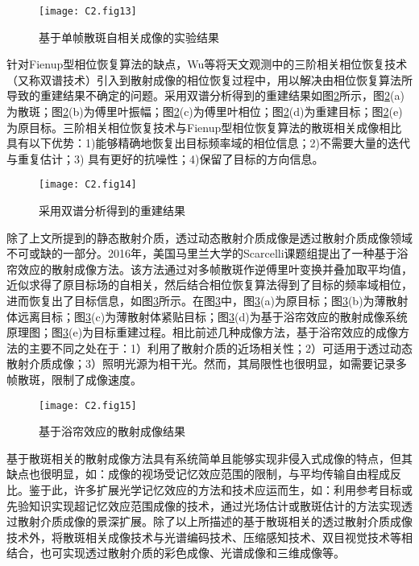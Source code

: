 \begin{figure}[htp]
	\centering
	\texttt{[image: C2.fig13]}
	\caption{基于单帧散斑自相关成像的实验结果}
	\label{fig2:13}
\end{figure}

针对Fienup型相位恢复算法的缺点，Wu等将天文观测中的三阶相关相位恢复技术（又称双谱技术）引入到散射成像的相位恢复过程中，用以解决由相位恢复算法所导致的重建结果不确定的问题。采用双谱分析得到的重建结果如图\ref{fig2:14}所示，图\ref{fig2:14}(a)为散斑；图\ref{fig2:14}(b)为傅里叶振幅；图\ref{fig2:14}(c)为傅里叶相位；图\ref{fig2:14}(d)为重建目标；图\ref{fig2:14}(e)为原目标。三阶相关相位恢复技术与Fienup型相位恢复算法的散斑相关成像相比具有以下优势：1)能够精确地恢复出目标频率域的相位信息；2)不需要大量的迭代与重复估计；3) 具有更好的抗噪性；4)保留了目标的方向信息。

\begin{figure}[htp]
	\centering
	\texttt{[image: C2.fig14]}
	\caption{采用双谱分析得到的重建结果}
	\label{fig2:14}
\end{figure}

除了上文所提到的静态散射介质，透过动态散射介质成像是透过散射介质成像领域不可或缺的一部分。2016年，美国马里兰大学的Scarcelli课题组提出了一种基于浴帘效应的散射成像方法。该方法通过对多帧散斑作逆傅里叶变换并叠加取平均值，近似求得了原目标场的自相关，然后结合相位恢复算法得到了目标的频率域相位，进而恢复出了目标信息，如图\ref{fig2:15}所示。在图\ref{fig2:15}中，图\ref{fig2:15}(a)为原目标；图\ref{fig2:15}(b)为薄散射体远离目标；图\ref{fig2:15}(c)为薄散射体紧贴目标；图\ref{fig2:15}(d)为基于浴帘效应的散射成像系统原理图；图\ref{fig2:15}(e)为目标重建过程。相比前述几种成像方法，基于浴帘效应的成像方法的主要不同之处在于：1）利用了散射介质的近场相关性；2）可适用于透过动态散射介质成像；3）照明光源为相干光。然而，其局限性也很明显，如需要记录多帧散斑，限制了成像速度。

\begin{figure}[htp]
	\centering
	\texttt{[image: C2.fig15]}
	\caption{基于浴帘效应的散射成像结果}
	\label{fig2:15}
\end{figure}

基于散斑相关的散射成像方法具有系统简单且能够实现非侵入式成像的特点，但其缺点也很明显，如：成像的视场受记忆效应范围的限制，与平均传输自由程成反比。鉴于此，许多扩展光学记忆效应的方法和技术应运而生，如：利用参考目标或先验知识实现超记忆效应范围成像的技术，通过光场估计或散斑估计的方法实现透过散射介质成像的景深扩展。除了以上所描述的基于散斑相关的透过散射介质成像技术外，将散斑相关成像技术与光谱编码技术、压缩感知技术、双目视觉技术等相结合，也可实现透过散射介质的彩色成像、光谱成像和三维成像等。

